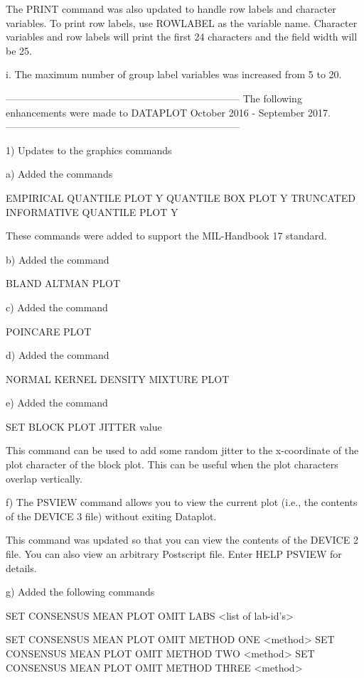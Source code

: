        The PRINT command was also updated to handle row labels and
       character variables.  To print row labels, use ROWLABEL as the
       variable name.  Character variables and row labels will print the
       first 24 characters and the field width will be 25.

    i. The maximum number of group label variables was increased from 5
       to 20.

-----------------------------------------------------------------------
The following enhancements were made to DATAPLOT
October 2016 - September 2017.
-----------------------------------------------------------------------

 1) Updates to the graphics commands

    a) Added the commands

         EMPIRICAL QUANTILE PLOT Y
         QUANTILE BOX PLOT Y
         TRUNCATED INFORMATIVE QUANTILE PLOT Y

       These commands were added to support the MIL-Handbook 17 standard.

    b) Added the command

         BLAND ALTMAN PLOT

    c) Added the command

         POINCARE PLOT

    d) Added the command

         NORMAL KERNEL DENSITY MIXTURE PLOT

    e) Added the command

          SET BLOCK PLOT JITTER  value

       This command can be used to add some random jitter to the
       x-coordinate of the plot character of the block plot.  This can
       be useful when the plot characters overlap vertically.

    f) The PSVIEW command allows you to view the current plot (i.e.,
       the contents of the DEVICE 3 file) without exiting Dataplot.

       This command was updated so that you can view the contents of
       the DEVICE 2 file.  You can also view an arbitrary Postscript
       file.  Enter HELP PSVIEW for details.

    g) Added the following commands

          SET CONSENSUS MEAN PLOT OMIT LABS <list of lab-id's>

          SET CONSENSUS MEAN PLOT OMIT METHOD ONE   <method>
          SET CONSENSUS MEAN PLOT OMIT METHOD TWO   <method>
          SET CONSENSUS MEAN PLOT OMIT METHOD THREE <method>

